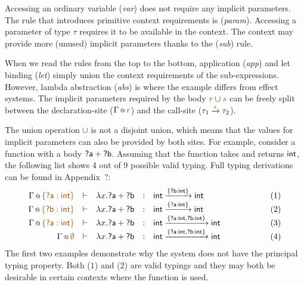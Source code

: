 Accessing an ordinary variable (\emph{var}) does not require any implicit parameters. The rule that 
introduces primitive context requirements is (\emph{param}). Accessing a parameter  
of type $\tau$ requires it to be available in the context. The context may provide more (unused) 
implicit parameters thanks to the (\emph{sub}) rule.

When we read the rules from the top to the bottom, application (\emph{app}) and let binding 
(\emph{let}) simply union the context requirements of the sub-expressions. However, lambda abstraction
(\emph{abs}) is where the example differs from effect systems. The implicit parameters required by
the body $\aclrd{r} \cup \aclrd{s}$ can be freely split between the declaration-site ($\coctx{\Gamma}{\aclrd{r}}$)
and the call-site ($\tau_1 \xrightarrow{\aclrd{s}} \tau_2$).

The union operation $\cup$ is not a disjoint union, which means that the values for implicit 
parameters can also be provided by both sites. For example, consider a function with a body
$\ident{?a} + \ident{?b}$. Assuming that the function takes and returns $\textnormal{\sffamily int}$, the following
list shows 4 out of 9 possible valid typing. Full typing derivations can be found in Appendix~?:
%
\begin{equation*}
\begin{array}{rcllllr}
\coctx{\Gamma}{\aclrd{ \{ \ident{?a}:\ident{int} \} }} &\vdash& \lambda x.\ident{?a} + \ident{?b} &:& 
  \ident{int} \xrightarrow{ \{ \ident{?b}:\ident{int} \} } \ident{int} &\qquad\qquad&(1) \\
\coctx{\Gamma}{\aclrd{ \{ \ident{?b}:\ident{int} \} }} &\vdash& \lambda x.\ident{?a} + \ident{?b} &:& 
  \ident{int} \xrightarrow{ \{ \ident{?a}:\ident{int} \} } \ident{int} &&(2)\\
\coctx{\Gamma}{\aclrd{ \{\ident{?a}:\ident{int} \} }} &\vdash& \lambda x.\ident{?a} + \ident{?b} &:& 
  \ident{int} \xrightarrow{ \{\ident{?a}:\ident{int}, \ident{?b}:\ident{int} \} } \ident{int} &&(3)\\
\coctx{\Gamma}{\aclrd{ \emptyset }} &\vdash& \lambda x.\ident{?a} + \ident{?b} &:& 
  \ident{int} \xrightarrow{ \{\ident{?a}:\ident{int}, \ident{?b}:\ident{int} \} } \ident{int} &&(4)
\end{array}
\end{equation*}
%
The first two examples demonstrate why the system does not have the principal typing property. 
Both ($1$) and ($2$) are valid typings and they may both be desirable in certain contexts where
the function is used. 

